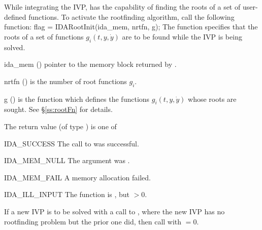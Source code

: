 {While integrating the IVP, {\ida} has the capability of finding the
roots of a set of user-defined functions. To activate the rootfinding 
algorithm, call the following function:
{
  flag = IDARootInit(ida\_mem, nrtfn, g);
}
{
  The function  specifies that the roots of a set of
  functions $g_i(t,y,\dot{y})$ are to be found while the IVP is being solved.
}
{
  \begin{args}
  \item[ida\_mem] ()
    pointer to the {\ida} memory block returned by .
  \item[nrtfn] ()
    is the number of root functions $g_i$.
  \item[g] ()
    is the {\C} function which defines the  functions $g_i(t,y,\dot{y})$
    whose roots are sought. See \S\ref{ss:rootFn} for details.
 \end{args}
}
{
  The return value  (of type ) is one of
  \begin{args}
  \item[IDA\_SUCCESS]
    The call to  was successful.
  \item[IDA\_MEM\_NULL]
    The  argument was .
  \item[IDA\_MEM\_FAIL]
    A memory allocation failed.
  \item[IDA\_ILL\_INPUT]
    The function  is , but $>0$.
  \end{args}
}
{
  If a new IVP is to be solved with a call to , where the new
  IVP has no rootfinding problem but the prior one did, then call
   with $=0$.
}



}
